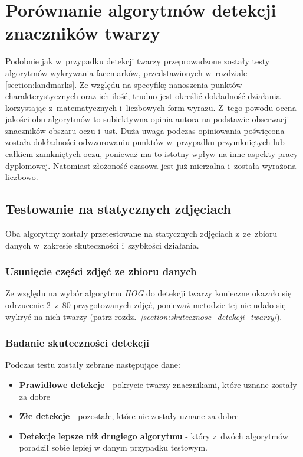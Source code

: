 \newpage

\section{Porównanie algorytmów detekcji znaczników twarzy}

Podobnie jak w~przypadku detekcji twarzy przeprowadzone zostały testy algorytmów wykrywania facemarków, przedstawionych w~rozdziale \hyperref[section:landmarks]{\ref{section:landmarks}}. Ze względu na specyfikę nanoszenia punktów charakterystycznych oraz ich ilość, trudno jest określić dokładność działania korzystając z~matematycznych i~liczbowych form wyrazu. Z~tego powodu ocena jakości obu algorytmów to subiektywna opinia autora na podstawie obserwacji znaczników obszaru oczu i~ust. Duża uwaga podczas opiniowania poświęcona została dokładności odwzorowaniu punktów w~przypadku przymkniętych lub całkiem zamkniętych oczu, ponieważ ma to istotny wpływ na inne aspekty pracy dyplomowej. Natomiast złożoność czasowa jest już mierzalna i~została wyrażona liczbowo. 




\subsection{Testowanie na statycznych zdjęciach}

Oba algorytmy zostały przetestowane na statycznych zdjęciach z~ze~zbioru danych w~zakresie skuteczności i~szybkości działania.

\subsubsection{Usunięcie części zdjęć ze zbioru danych}

Ze względu na wybór algorytmu \textit{HOG} do detekcji twarzy konieczne okazało się odrzucenie 2~z~80 przygotowanych zdjęć, ponieważ metodzie tej nie udało się wykryć na nich twarzy (patrz rozdz.~\hyperref[{section:skutecznosc_detekcji_twarzy}]{\textit{\ref{section:skutecznosc_detekcji_twarzy}}}).

\subsubsection{Badanie skuteczności detekcji}

Podczas testu zostały zebrane następujące dane:

\begin{itemize}
    \item \textbf{Prawidłowe detekcje} - pokrycie twarzy znacznikami, które uznane zostały za dobre
    \item \textbf{Złe detekcje} - pozostałe, które nie zostały uznane za dobre
    \item \textbf{Detekcje lepsze niż drugiego algorytmu} - który z~dwóch algorytmów poradził sobie lepiej w danym przypadku testowym. 
\end{itemize}

